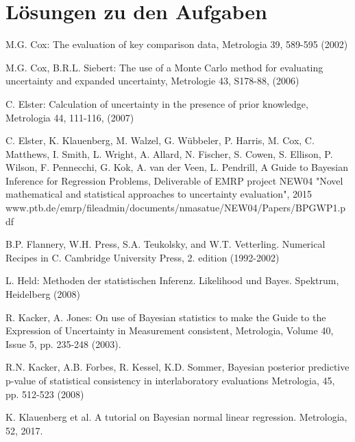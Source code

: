 \documentclass[a4paper,11pt]{book}
\begin{document}
\chapter{Lösungen zu den Aufgaben}




\begin{flushleft}
\begin{thebibliography}{------}
     M.G. Cox: The evaluation of key comparison data, Metrologia 39, 589-595 (2002)

     M.G. Cox, B.R.L. Siebert: The use of
    a Monte Carlo method for evaluating uncertainty and expanded uncertainty, Metrologie 43, S178-88, (2006)

     C. Elster: Calculation of uncertainty in the presence of prior knowledge, Metrologia 44, 111-116, (2007)

     C. Elster, K. Klauenberg, M. Walzel, G. Wübbeler, P. Harris, M. Cox, C. Matthews, I. Smith, L. Wright, A. Allard, N. Fischer, S. Cowen, S. Ellison,
    P. Wilson, F. Pennecchi, G. Kok, A. van der Veen, L. Pendrill,
    A Guide to Bayesian Inference for Regression Problems, Deliverable of EMRP project NEW04 "Novel mathematical and statistical approaches to uncertainty evaluation", 2015 \newline
    www.ptb.de/emrp/fileadmin/documents/nmasatue/NEW04/Papers/BPGWP1.pdf

     B.P. Flannery, W.H. Press, S.A. Teukolsky, and W.T. Vetterling. Numerical Recipes in C. Cambridge University Press, 2. edition (1992-2002)

     L. Held: Methoden der statistischen Inferenz. Likelihood und Bayes. Spektrum, Heidelberg (2008)

     R. Kacker, A. Jones: On use of Bayesian statistics to make the Guide to the Expression of Uncertainty in Measurement consistent, Metrologia, Volume 40, Issue 5, pp. 235-248 (2003).

     R.N. Kacker, A.B. Forbes, R. Kessel, K.D. Sommer, Bayesian posterior predictive
    p-value of statistical consistency in interlaboratory evaluations Metrologia, 45, pp. 512-523 (2008)

     K. Klauenberg et al. A tutorial on Bayesian normal linear regression. Metrologia, 52, 2017.


\end{thebibliography}
\end{flushleft}
\end{document}
